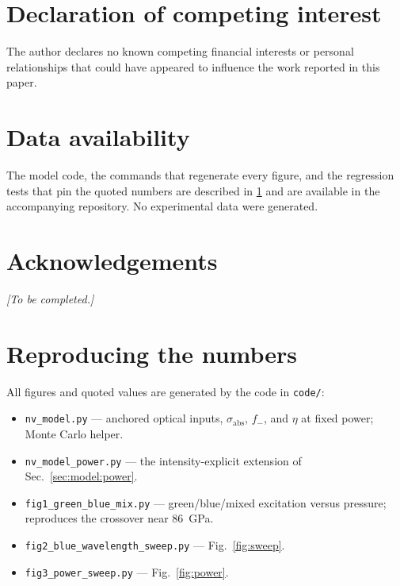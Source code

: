 \documentclass[preprint,12pt]{elsarticle}
\newcommand{\sabs}{\ensuremath{\sigma_{\mathrm{abs}}}}
\newcommand{\fm}{\ensuremath{f_{-}}}
\begin{document}
\section*{Declaration of competing interest}

The author declares no known competing financial interests or personal
relationships that could have appeared to influence the work reported in this
paper.

\section*{Data availability}

The model code, the commands that regenerate every figure, and the regression
tests that pin the quoted numbers are described in \ref{app:repro} and are
available in the accompanying repository. No experimental data were generated.

\section*{Acknowledgements}

\emph{[To be completed.]}

\appendix

\section{Reproducing the numbers}
\label{app:repro}

All figures and quoted values are generated by the code in \texttt{code/}:

\begin{itemize}
  \item \texttt{nv\_model.py} --- anchored optical inputs, $\sabs$, $\fm$, and
    $\eta$ at fixed power; Monte Carlo helper.
  \item \texttt{nv\_model\_power.py} --- the intensity-explicit extension of
    Sec.~\ref{sec:model:power}.
  \item \texttt{fig1\_green\_blue\_mix.py} --- green/blue/mixed excitation versus
    pressure; reproduces the crossover near \SI{86}{\giga\pascal}.
  \item \texttt{fig2\_blue\_wavelength\_sweep.py} --- Fig.~\ref{fig:sweep}.
  \item \texttt{fig3\_power\_sweep.py} --- Fig.~\ref{fig:power}.
\end{itemize}
\end{document}
